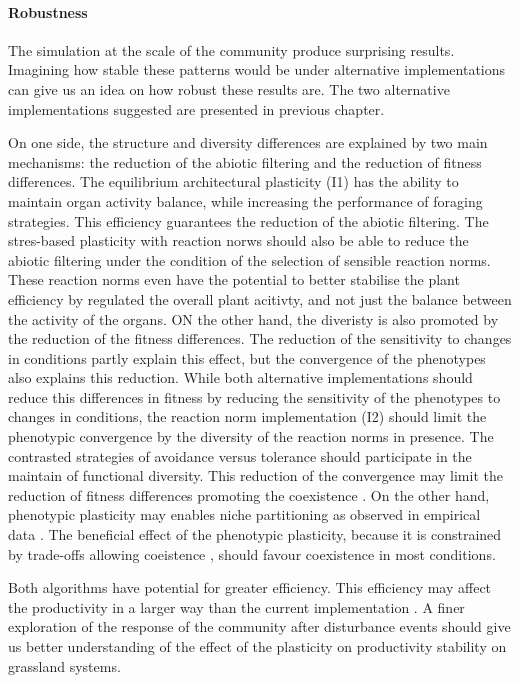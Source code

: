 \paragraph{Robustness}

The simulation at the scale of the community produce surprising results. Imagining how stable these patterns would be under alternative implementations can give us an idea on how robust these results are. The two alternative implementations suggested are presented in previous chapter. 

On one side, the structure and diversity differences are explained by two main mechanisms: the reduction of the abiotic filtering and the reduction of fitness differences. The equilibrium architectural plasticity (I1) has the ability to maintain organ activity balance, while increasing the performance of foraging strategies. This efficiency \parencite{maire_plasticity_2013} guarantees the reduction of the abiotic filtering. The stres-based plasticity with reaction norws should also be able to reduce the abiotic filtering under the condition of the selection of sensible reaction norms. These reaction norms even have the potential to better stabilise the plant efficiency by regulated the overall plant acitivty, and not just the balance between the activity of the organs. ON the other hand, the diveristy is also promoted by the reduction of the fitness differences. The reduction of the sensitivity to changes in conditions partly explain this effect, but the convergence of the phenotypes also explains this reduction. While both alternative implementations should reduce this differences in fitness by reducing the sensitivity of the phenotypes to changes in conditions, the reaction norm implementation (I2) should limit the phenotypic convergence by the diversity of the reaction norms in presence. The contrasted strategies of avoidance versus tolerance should participate in the maintain of functional diversity. This reduction of the convergence may limit the reduction of fitness differences promoting the coexistence \parencite{chesson_general_2000}. On the other hand, phenotypic plasticity may enables niche partitioning as observed in empirical data \parencite{zuppinger-dingley_selection_2014, roscher_contrasting_2015}. The beneficial effect of the phenotypic plasticity, because it is constrained by trade-offs allowing coeistence \parencite{tilman_niche_2004}, should favour coexistence in most conditions.


Both algorithms have potential for greater efficiency. This efficiency may affect the productivity in a larger way than the current implementation \parencite{maire_plasticity_2013}. A finer exploration of the response of the community after disturbance events should give us better understanding of the effect of the plasticity on productivity stability \parencite{richter_phenotypic_2012} on grassland systems.

